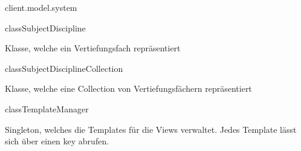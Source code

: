 \begin{texdocpackage}{client.model.system}
\begin{texdocclass}{class}{SubjectDiscipline}
\label{texdoclet:edu.kit.informatik.studyplan.client.model.system.SubjectDiscipline}
\begin{texdocclassintro}
Klasse, welche ein Vertiefungsfach repräsentiert\end{texdocclassintro}
\begin{texdocclassfields}
\end{texdocclassfields}
\begin{texdocclassconstructors}
\end{texdocclassconstructors}
\end{texdocclass}


\begin{texdocclass}{class}{SubjectDisciplineCollection}
\label{texdoclet:edu.kit.informatik.studyplan.client.model.system.SubjectDisciplineCollection}
\begin{texdocclassintro}
Klasse, welche eine Collection von Vertiefungsfächern repräsentiert\end{texdocclassintro}
\begin{texdocclassfields}
\end{texdocclassfields}
\begin{texdocclassconstructors}
\end{texdocclassconstructors}
\end{texdocclass}


\begin{texdocclass}{class}{TemplateManager}
\label{texdoclet:edu.kit.informatik.studyplan.client.model.system.TemplateManager}
\begin{texdocclassintro}
Singleton, welches die Templates für die Views verwaltet. Jedes Template
 lässt sich über einen key abrufen.\texdocbr{}


\end{texdocclassintro}
\end{texdocclass}
\end{texdocpackage}
